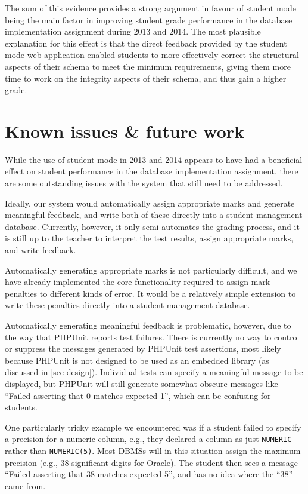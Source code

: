 \documentclass[sigconf, authordraft, capitalise]{acmart}
\begin{document}
The sum of this evidence provides a strong argument in favour of student mode being the main factor in improving student grade performance in the database implementation assignment during 2013 and 2014. The most plausible explanation for this effect is that the direct feedback provided by the student mode web application enabled students to more effectively correct the structural aspects of their schema to meet the minimum requirements, giving them more time to work on the integrity aspects of their schema, and thus gain a higher grade.


\section{Known issues \& future work}
\label{sec-issues}

While the use of student mode in 2013 and 2014 appears to have had a beneficial effect on student performance in the database implementation assignment, there are some outstanding issues with the system that still need to be addressed.

Ideally, our system would automatically assign appropriate marks and generate meaningful feedback, and write both of these directly into a student management database. Currently, however, it only semi-automates the grading process, and it is still up to the teacher to interpret the test results, assign appropriate marks, and write feedback.

Automatically generating appropriate marks is not particularly difficult, and we have already implemented the core functionality required to assign mark penalties to different kinds of error. It would be a relatively simple extension to write these penalties directly into a student management database.

Automatically generating meaningful feedback is problematic, however, due to the way that PHPUnit reports test failures. There is currently no way to control or suppress the messages generated by PHPUnit test assertions, most likely because PHPUnit is not designed to be used as an embedded library (as discussed in \cref{sec-design}). Individual tests can specify a meaningful message to be displayed, but PHPUnit will still generate somewhat obscure messages like ``Failed asserting that 0 matches expected 1'', which can be confusing for students.

One particularly tricky example we encountered was if a student failed to specify a precision for a numeric column, e.g., they declared a column as just \texttt{NUMERIC} rather than \texttt{NUMERIC(5)}. Most DBMSs will in this situation assign the maximum precision (e.g., 38 significant digits for Oracle). The student then sees a message ``Failed asserting that 38 matches expected 5'', and has no idea where the ``38'' came from.
\end{document}
